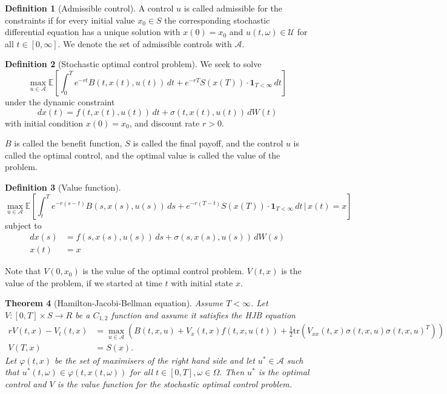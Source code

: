 \documentclass[10pt, oneside, reqno]{amsart}
\theoremstyle{plain}%
\newtheorem{thm}{Theorem}[section]
\theoremstyle{definition}
\newtheorem{defn}[thm]{Definition}
\theoremstyle{remark}
\newcommand{\given}{ \, | \,}
\renewcommand{\phi}{\varphi}
\newcommand{\E}{\mathbb{E}}
\begin{document}
\begin{defn}[Admissible control]
	A control $u$ is called admissible for the constraints if for every initial value $x_0 \in S$ the corresponding stochastic differential equation has a unique solution with $x(0) = x_0$ and $u(t, \omega) \in \mathcal U$ for all $t \in [0, \infty]$.  We denote the set of admissible controls with $\mathcal A$.  
\end{defn}

\begin{defn}[Stochastic optimal control problem]
	We seek to solve \[
		\max_{u \in \mathcal A} \E \left[ \int_0^T e^{-rt} B(t, x(t), u(t)) \, dt + e^{-rT}S(x(T)) \cdot \mathbf{1}_{T < \infty} \, dt\right]
	\] under the dynamic constraint \[
		dx(t) = f(t, x(t), u(t)) \, dt + \sigma(t, x(t), u(t)) \, dW(t)
	\] with initial condition $x(0) = x_0$, and discount rate $r > 0$.  
	
	$B$ is called the benefit function, $S$ is called the final payoff, and the control $u$ is called the optimal control, and the optimal value is called the value of the problem.
\end{defn}

\begin{defn}[Value function] \[
	\max_{u \in \mathcal A} \E \left[ \int_t^T e^{-r(s-t)} B(s, x(s), u(s)) \, ds + e^{-r(T-t)}S(x(T)) \cdot \mathbf{1}_{T < \infty} \, dt \given x(t) = x \right]
	\] subject to \begin{align*}
		dx(s) &= f(s, x(s), u(s)) \, ds + \sigma(s, x(s), u(s)) \, dW(s) \\
		x(t) &= x
	\end{align*}  
	
	Note that $V(0, x_0)$ is the value of the optimal control problem. $V(t, x)$ is the value of the problem, if we started at time $t$ with initial state $x$.  
\end{defn}

\begin{thm}[Hamilton-Jacobi-Bellman equation]
	Assume $T < \infty$.  Let $V: [0, T] \times S \rightarrow R$ be a $C_{1, 2}$ function and assume it satisfies the HJB equation \begin{align*}
		rV(t, x) - V_t(t, x) &= \max_{u \in \mathcal A} \left(B(t, x, u) + V_x(t, x) f(t, x, u(t)) + \frac{1}{2} \text{tr}(V_{xx}(t, x) \sigma(t, x, u) \sigma(t, x, u)^T) \right) \\
		V(T, x) &= S(x).
	\end{align*}  Let $\phi(t, x)$ be the set of maximisers of the right hand side and let $u^* \in \mathcal A$ such that $u^*(t, \omega) \in \phi(t, x(t, \omega))$ for all $t \in [ 0, T], \omega \in \Omega$. Then $u^*$ is the optimal control and $V$ is the value function for the stochastic optimal control problem.  
\end{thm}
\end{document}
